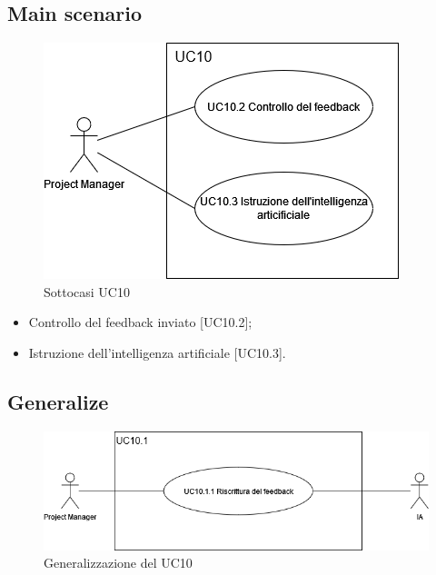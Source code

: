 \documentclass{article}
\begin{document}
    \subsection*{Main scenario}
        \begin{figure}[h]
            \centering
            \includegraphics[width=.8\textwidth, height=.6\textheight, keepaspectratio]{documenti/imgUML/UC10-zoom.drawio.png}
            \caption{Sottocasi UC10}
            \label{fig:UC10_sottocasi}
        \end{figure}
        \begin{itemize}
            \item Controllo del feedback inviato [UC10.2];
            \item Istruzione dell'intelligenza artificiale [UC10.3].
        \end{itemize}
        
    \subsection*{Generalize}
      \begin{figure}[h]
            \centering
            \includegraphics[width=.8\textwidth, height=.6\textheight, keepaspectratio]{documenti/imgUML/UC10.1-VALIDAZIONE-FEEDBACK-NON-APPROVATA.drawio.png}
            \caption{Generalizzazione del UC10}
            \label{fig:UC10_generalizzazione}
        \end{figure}
\end{document}
